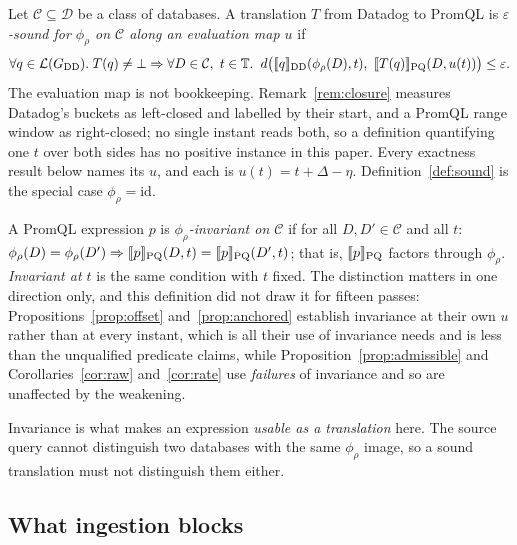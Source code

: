 \begin{definition}\label{def:phi-sound}
Let $\mathcal{C}\subseteq\mathcal{D}$ be a class of databases. A translation $T$ from
Datadog to PromQL is \emph{$\varepsilon$-sound for $\phi_\rho$ on $\mathcal{C}$ along an
evaluation map $u$} if
\[
\forall q\in \Lang(G_{\mathrm{DD}}).\; T(q)\neq\bot \Rightarrow \forall D\in\mathcal{C},\ t\in\mathbb{T}.\;\;
d\big(\sem{q}_{\mathrm{DD}}(\phi_\rho(D),t),\ \sem{T(q)}_{\mathrm{PQ}}(D,u(t))\big)\le\varepsilon .
\]
The evaluation map is not bookkeeping. Remark~\ref{rem:closure} measures Datadog's
buckets as left-closed and labelled by their start, and a PromQL range window as
right-closed; no single instant reads both, so a definition quantifying one $t$ over both
sides has no positive instance in this paper. Every exactness result below names its
$u$, and each is $u(t)=t+\Delta-\eta$.
Definition~\ref{def:sound} is the special case
$\phi_\rho=\mathrm{id}$.
\end{definition}

\begin{definition}\label{def:phi-inv}
A PromQL expression $p$ is \emph{$\phi_\rho$-invariant on $\mathcal{C}$} if for all
$D,D'\in\mathcal{C}$ and all $t$:
$\phi_\rho(D)=\phi_\rho(D')\Rightarrow \llbracket p \rrbracket_{\mathrm{PQ}}(D,t)=\llbracket p \rrbracket_{\mathrm{PQ}}(D',t)$;
that is, $\llbracket p \rrbracket_{\mathrm{PQ}}$ factors through $\phi_\rho$. \emph{Invariant at $t$} is
the same condition with $t$ fixed. The distinction matters in one direction only, and
this definition did not draw it for fifteen passes:
Propositions~\ref{prop:offset} and~\ref{prop:anchored} establish invariance at their own
$u$ rather than at every instant, which is all their use of invariance needs and is
less than the unqualified predicate claims, while
Proposition~\ref{prop:admissible} and Corollaries~\ref{cor:raw} and~\ref{cor:rate} use
\emph{failures} of invariance and so are unaffected by the weakening.
\end{definition}

\noindent
Invariance is what makes an expression \emph{usable as a translation} here. The source
query cannot distinguish two databases with the same $\phi_\rho$ image, so a sound
translation must not distinguish them either.

\subsection{What ingestion blocks}

